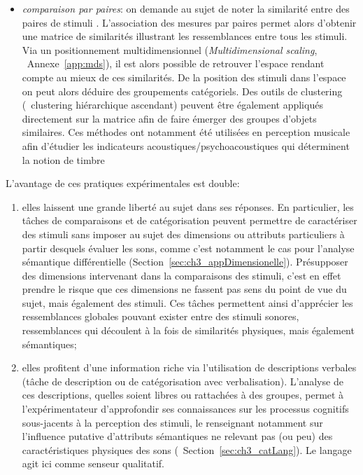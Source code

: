 \begin{itemize}
\item \emph{comparaison par paires}: on demande au sujet de noter la similarité entre des paires de stimuli \citep{gygi2007similarity}. L'association des mesures par paires permet alors d'obtenir une matrice de similarités illustrant les ressemblances entre tous les stimuli. Via un positionnement multidimensionnel (\emph{Multidimensional scaling}, \cf~Annexe~\ref{app:mds}), il est alors possible de retrouver l'espace rendant compte au mieux de ces similarités. De la position des stimuli dans l'espace on peut alors déduire des groupements catégoriels. Des outils de clustering (\eg~clustering hiérarchique ascendant) peuvent être également appliqués directement sur la matrice afin de faire émerger des groupes d'objets similaires. Ces méthodes ont notamment été utilisées en perception musicale afin d'étudier les indicateurs acoustiques/psychoacoustiques qui déterminent la notion de timbre \citep{caclin2005acoustic}
\end{itemize}

L'avantage de ces pratiques expérimentales est double:

\begin{enumerate}

\item elles laissent une grande liberté au sujet dans ses réponses. En particulier, les tâches de comparaisons et de catégorisation peuvent permettre de caractériser des stimuli sans imposer au sujet des dimensions ou attributs particuliers à partir desquels évaluer les sons, comme c'est notamment le cas pour l'analyse sémantique différentielle (\cf Section~\ref{sec:ch3_appDimensionelle}). Présupposer des dimensions intervenant dans la comparaisons des stimuli, c'est en effet prendre le risque que ces dimensions ne fassent pas sens du point de vue du sujet, mais également des stimuli. Ces tâches permettent ainsi d'apprécier les ressemblances globales pouvant exister entre des stimuli sonores, ressemblances qui découlent à la fois de similarités physiques, mais également sémantiques;

\item elles profitent d'une information riche via l'utilisation de descriptions verbales (tâche de description ou de catégorisation avec verbalisation). L'analyse de ces descriptions, quelles soient libres ou rattachées à des groupes, permet à l'expérimentateur d’approfondir ses connaissances sur les processus cognitifs sous-jacents à la perception des stimuli, le renseignant notamment sur l'influence putative d'attributs sémantiques ne relevant pas (ou peu) des caractéristiques physiques des sons (\cf~Section~\ref{sec:ch3_catLang}). Le langage agit ici comme senseur qualitatif.

\end{enumerate}

